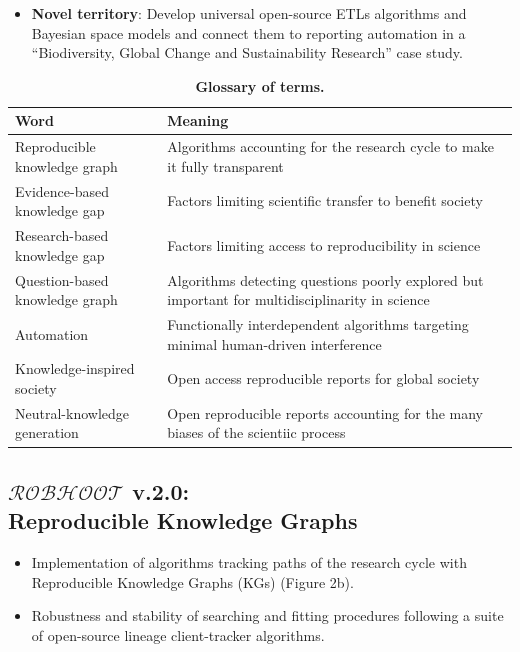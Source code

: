 \documentclass[12pt, a4paper]{article} %
\begin{document}
    \begin{itemize}
    \item {\bf Novel territory}: Develop universal open-source ETLs
      algorithms and Bayesian space models and connect them to
      reporting automation in a ``Biodiversity, Global Change and
      Sustainability Research'' case study.
   \end{itemize}

   
\begin{table}[ht]
\begin{tabular}{ p{5.5cm} | p{11cm}}
  \hline \hline
  \textbf{Word} &\textbf{Meaning}\\  \hline
  Reproducible knowledge graph & Algorithms accounting for the research cycle to make it fully transparent\\ \hline
  Evidence-based knowledge gap & Factors limiting scientific transfer to benefit society\\ \hline
  Research-based knowledge gap & Factors limiting access to reproducibility in science\\ \hline
  Question-based knowledge graph & Algorithms detecting questions poorly explored but important for multidisciplinarity in science\\ \hline
  Automation & Functionally interdependent algorithms targeting minimal human-driven interference\\ \hline
  Knowledge-inspired society & Open access reproducible reports for global society \\ \hline
  Neutral-knowledge generation & Open reproducible reports accounting for the many biases of the scientiic process\\ \hline

  \bottomrule
\end{tabular}
\caption{{\bf Glossary of terms.}}
\end{table}

   
  \subsection{{\bf $\mathcal{ROBHOOT}$ v.2.0}: \\ Reproducible Knowledge Graphs}
  \begin{itemize}
  \item Implementation of algorithms tracking paths of the research
    cycle with Reproducible Knowledge Graphs (KGs) (Figure 2b).
  \item Robustness and stability of searching and fitting procedures
    following a suite of open-source lineage client-tracker
    algorithms.
  \end{itemize}
\end{document}
